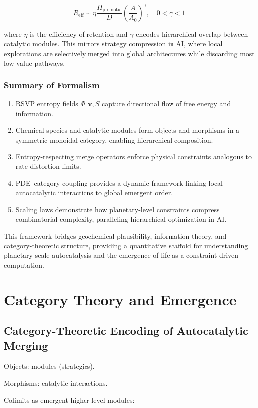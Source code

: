 \documentclass{book}
\begin{document}
\[R_{\mathrm{eff}} \sim \eta \frac{H_{\mathrm{prebiotic}}}{D} \left( \frac{A}{A_0} \right)^\gamma, \quad 0 < \gamma < 1\]

where $\eta$ is the efficiency of retention and $\gamma$ encodes hierarchical overlap between catalytic modules. This mirrors strategy compression in AI, where local explorations are selectively merged into global architectures while discarding most low-value pathways.

\section{Summary of Formalism}
\begin{enumerate}
\item RSVP entropy fields $\Phi, \mathbf{v}, S$ capture directional flow of free energy and information.
\item Chemical species and catalytic modules form objects and morphisms in a symmetric monoidal category, enabling hierarchical composition.
\item Entropy-respecting merge operators enforce physical constraints analogous to rate-distortion limits.
\item PDE–category coupling provides a dynamic framework linking local autocatalytic interactions to global emergent order.
\item Scaling laws demonstrate how planetary-level constraints compress combinatorial complexity, paralleling hierarchical optimization in AI.
\end{enumerate}

This framework bridges geochemical plausibility, information theory, and category-theoretic structure, providing a quantitative scaffold for understanding planetary-scale autocatalysis and the emergence of life as a constraint-driven computation.

\part{Category Theory and Emergence}

\chapter{Category-Theoretic Encoding of Autocatalytic Merging}
Objects: modules (strategies).

Morphisms: catalytic interactions.

Colimits as emergent higher-level modules:
\end{document}
